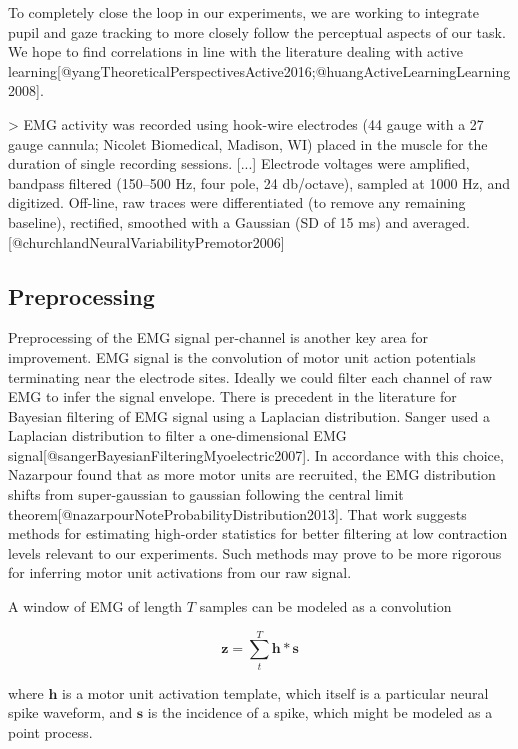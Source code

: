 \documentclass[../main.tex]{subfiles}
\begin{document}
To completely close the loop in our experiments, we are working to integrate pupil and gaze tracking to more closely follow the perceptual aspects of our task. We hope to find correlations in line with the literature dealing with active learning[@yangTheoreticalPerspectivesActive2016;@huangActiveLearningLearning2008]. 

> EMG activity was recorded using hook-wire electrodes (44 gauge with a 27 gauge cannula; Nicolet Biomedical, Madison, WI) placed in the muscle for the duration of single recording sessions. [...] Electrode voltages were amplified, bandpass filtered (150–500 Hz, four pole, 24 db/octave), sampled at 1000 Hz, and digitized. Off-line, raw traces were differentiated (to remove any remaining baseline), rectified, smoothed with a Gaussian (SD of 15 ms) and averaged. [@churchlandNeuralVariabilityPremotor2006] 

\subsection{Preprocessing}

Preprocessing of the EMG signal per-channel is another key area for improvement. EMG signal is the convolution of motor unit action potentials terminating near the electrode sites. Ideally we could filter each channel of raw EMG to infer the signal envelope. There is precedent in the literature for Bayesian filtering of EMG signal using a Laplacian distribution. Sanger used a Laplacian distribution to filter a one-dimensional EMG signal[@sangerBayesianFilteringMyoelectric2007]. In accordance with this choice, Nazarpour found that as more motor units are recruited, the EMG distribution shifts from super-gaussian to gaussian following the central limit theorem[@nazarpourNoteProbabilityDistribution2013]. That work suggests methods for estimating high-order statistics for better filtering at low contraction levels relevant to our experiments. Such methods may prove to be more rigorous for inferring motor unit activations from our raw signal.


A window of EMG of length $T$ samples can be modeled as a convolution

$$
\mathbf{z} = \sum_t^T \mathbf{h} * \mathbf{s}
$$

where $\mathbf{h}$ is a motor unit activation template, which itself is a particular neural spike waveform, and $\mathbf{s}$ is the incidence of a spike, which might be modeled as a point process.  

  
\end{document}
